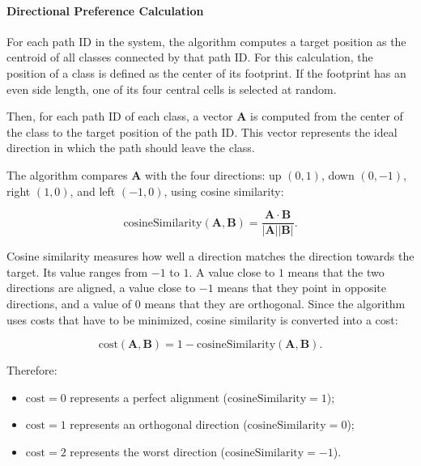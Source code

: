 \documentclass[../../main.tex]{subfiles}
\begin{document}
\paragraph{Directional Preference Calculation}

For each path ID in the system, the algorithm computes a target position as the centroid of all classes connected by that path ID. For this calculation, the position of a class is defined as the center of its footprint. If the footprint has an even side length, one of its four central cells is selected at random.

Then, for each path ID of each class, a vector $\mathbf{A}$ is computed from the center of the class to the target position of the path ID. This vector represents the ideal direction in which the path should leave the class.

The algorithm compares $\mathbf{A}$ with the four directions: up $(0,1)$, down $(0,-1)$, right $(1,0)$, and left $(-1,0)$, using cosine similarity:

\begin{equation}
    \mathrm{cosineSimilarity}(\mathbf{A},\mathbf{B}) = \frac{\mathbf{A}\cdot\mathbf{B}}{|\mathbf{A}||\mathbf{B}|}.
\end{equation}

Cosine similarity measures how well a direction matches the direction towards the target. Its value ranges from $-1$ to $1$. A value close to $1$ means that the two directions are aligned, a value close to $-1$ means that they point in opposite directions, and a value of $0$ means that they are orthogonal. Since the algorithm uses costs that have to be minimized, cosine similarity is converted into a cost:

\begin{equation}
    \mathrm{cost}(\mathbf{A},\mathbf{B}) = 1-\mathrm{cosineSimilarity}(\mathbf{A},\mathbf{B}).
\end{equation}

\noindent Therefore:

\begin{itemize}
    \item $\mathrm{cost}=0$ represents a perfect alignment ($\mathrm{cosineSimilarity}=1$);
    \item $\mathrm{cost}=1$ represents an orthogonal direction ($\mathrm{cosineSimilarity}=0$);
    \item $\mathrm{cost}=2$ represents the worst direction ($\mathrm{cosineSimilarity}=-1$).
\end{itemize}
\end{document}
